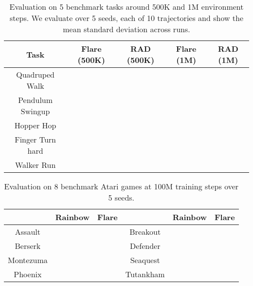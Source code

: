 \documentclass{article} \usepackage{iclr2021_conference,times}
\begin{document}
%
 \begin{table}
\centering
\begin{tabular}{c|cc|cc}
Task & Flare (500K) & RAD (500K) & Flare (1M) & RAD (1M)\\ \hline
Quadruped Walk &  &  &  &  \\
Pendulum Swingup &  &  &  & \\ 
Hopper Hop &  &  &  &  \\
Finger Turn hard &  &  &  &  \\
Walker Run &  &  &  &  \\
\end{tabular}
\vspace{-2mm}
\caption{\small{Evaluation on  5  benchmark  tasks around  500K and 1M environment steps. We evaluate over 5 seeds, each of 10 trajectories and show the mean  standard deviation across runs. }}\label{tab:results}
\vspace{-3mm}
\end{table}
\begin{table}
\centering
\begin{tabular}{ccc|ccc}
 & Rainbow & Flare & & Rainbow & Flare \\ \hline
Assault &  &  & Breakout &  &  \\
Berserk &  &  & Defender &  & \\ 
Montezuma &  &  & Seaquest &  &  \\
Phoenix &  &  & Tutankham & &  \\
\end{tabular}
\vspace{-2mm}
\caption{\small{Evaluation on  8 benchmark  Atari games at 100M training steps over 5 seeds. }}\label{tab:atari}
\vspace{-6mm}
\end{table}
\vspace{-3mm}
\end{document}
